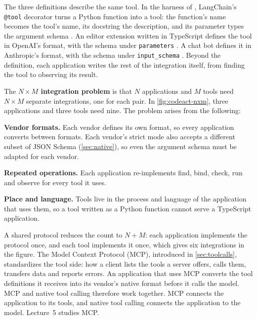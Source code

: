 The three definitions describe the same tool. In the harness of \msa{}, LangChain's \texttt{@tool}
decorator turns a Python function into a tool: the function's name becomes the tool's name, its
docstring the description, and its parameter types the argument schema \citep{langchain-tools}. An
editor extension written in TypeScript defines the tool in OpenAI's format, with the schema under
\texttt{parameters} \citep{openai-function-calling}. A chat bot defines it in Anthropic's format,
with the schema under \texttt{input\_schema} \citep{anthropic-tooluse}. Beyond the definition, each
application writes the rest of the integration itself, from finding the tool to observing its
result.

The \textbf{\boldmath$N \times M$ integration problem} is that $N$ applications and $M$ tools need
$N \times M$ separate integrations, one for each pair. In \cref{fig:codeact-nxm}, three
applications and three tools need nine. The problem arises from the following:
\bi
\item \textbf{Vendor formats.} Each vendor defines its own format, so every application converts
between formats. Each vendor's strict mode also accepts a different subset of JSON Schema
(\cref{sec:native}), so even the argument schema must be adapted for each vendor.
\item \textbf{Repeated operations.} Each application re-implements find, bind, check, run and
observe for every tool it uses.
\item \textbf{Place and language.} Tools live in the process and language of the application that
uses them, so a tool written as a Python function cannot serve a TypeScript application.
\ei

A shared protocol reduces the count to $N + M$: each application implements the protocol once, and
each tool implements it once, which gives six integrations in the figure. The Model Context
Protocol (MCP), introduced in \cref{sec:toolcalls}, standardizes the tool side: how a client lists
the tools a server offers, calls them, transfers data and reports errors. An application that uses
MCP converts the tool definitions it receives into its vendor's native format before it calls the
model. MCP and native tool calling therefore work together. MCP connects the application to its
tools, and native tool calling connects the application to the model. Lecture~5
studies MCP.

